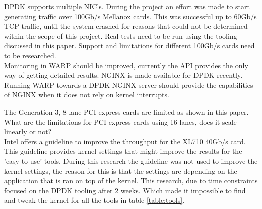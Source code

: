 DPDK supports multiple NIC's. During the project an effort was made to start generating traffic over 100Gb/s Mellanox cards.
This was successful up to 60Gb/s TCP traffic, until the system crashed for reasons that could not be determined within the scope of this project. 
Real tests need to be run using the tooling discussed in this paper. 
Support and limitations for different 100Gb/s cards need to be researched.\\

Monitoring in WARP should be improved, currently the API provides the only way of getting detailed results.
NGINX is made available for DPDK recently. Running WARP towards a DPDK NGINX server should provide the capabilities of NGINX when it does not rely on kernel interrupts.

The Generation 3, 8 lane PCI express cards are limited as shown in this paper. What are the limitations for PCI express cards using 16 lanes, does it scale linearly or not? \\

Intel offers a guideline to improve the throughput for the XL710 40Gb/s card. This guideline provides kernel settings that might improve the results for the 'easy to use' tools.
During this research the guideline was not used to improve the kernel settings, the reason for this is that the settings are depending on the application that is ran on top of the kernel. 
This research, due to time constraints focused on the DPDK tooling after 2 weeks. Which made it impossible to find and tweak the kernel for all the tools in table \ref{table:tools}. 

